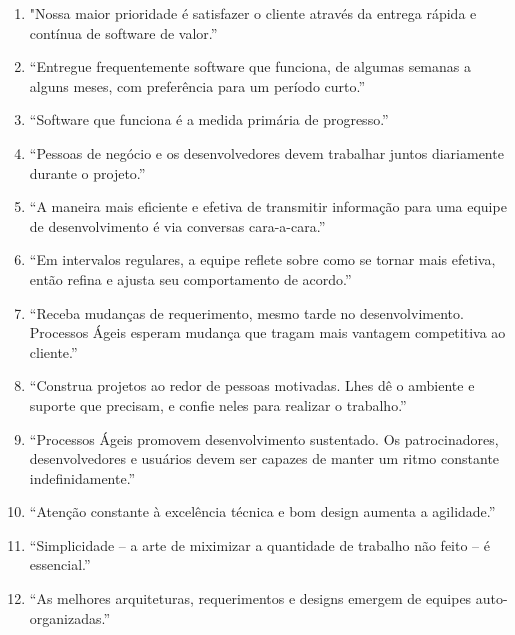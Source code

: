 \begin{enumerate}

\item "Nossa maior prioridade é satisfazer o cliente através da entrega rápida e contínua de software de valor.''
    
\item ``Entregue frequentemente software que funciona, de algumas semanas a alguns meses, com preferência para um período curto.''
   
\item ``Software que funciona é a medida primária de progresso.''

\item ``Pessoas de negócio e os desenvolvedores devem trabalhar juntos diariamente durante o projeto.''

\item ``A maneira mais eficiente e efetiva de transmitir informação para uma equipe de desenvolvimento é via conversas cara-a-cara.''

\item ``Em intervalos regulares, a equipe reflete sobre como se tornar mais efetiva, então refina e ajusta seu comportamento de acordo.''

\item ``Receba mudanças de requerimento, mesmo tarde no desenvolvimento. Processos Ágeis esperam mudança que tragam mais vantagem competitiva ao cliente.''

\item ``Construa projetos ao redor de pessoas motivadas. Lhes dê o ambiente e suporte que precisam, e confie neles para realizar o trabalho.''

\item ``Processos Ágeis promovem desenvolvimento sustentado. Os patrocinadores, desenvolvedores e usuários devem ser capazes de manter um ritmo constante indefinidamente.''

\item ``Atenção constante à excelência técnica e bom design aumenta a agilidade.''

\item ``Simplicidade – a arte de miximizar a quantidade de trabalho não feito – é essencial.''

\item ``As melhores arquiteturas, requerimentos e designs emergem de equipes auto-organizadas.''

\end{enumerate}



